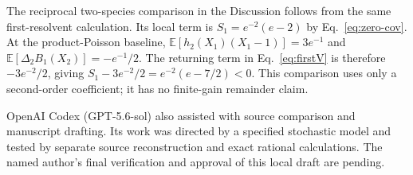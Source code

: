 \documentclass[aps,pre,twocolumn,showpacs,amsmath,amssymb]{revtex4-2}
\begin{document}
The reciprocal two-species comparison in the Discussion follows from the same first-resolvent calculation. Its local term is $S_1=e^{-2}(e-2)$ by Eq.~\eqref{eq:zero-cov}. At the product-Poisson baseline, $\mathbb E[h_2(X_1)(X_1-1)]=3e^{-1}$ and $\mathbb E[\Delta_2B_1(X_2)]=-e^{-1}/2$. The returning term in Eq.~\eqref{eq:firstV} is therefore $-3e^{-2}/2$, giving $S_1-3e^{-2}/2=e^{-2}(e-7/2)<0$. This comparison uses only a second-order coefficient; it has no finite-gain remainder claim.

\begin{acknowledgments}
OpenAI Codex (GPT-5.6-sol) also assisted with source comparison and manuscript drafting. Its work was directed by a specified stochastic model and tested by separate source reconstruction and exact rational calculations. The named author's final verification and approval of this local draft are pending.
\end{acknowledgments}



\end{document}
